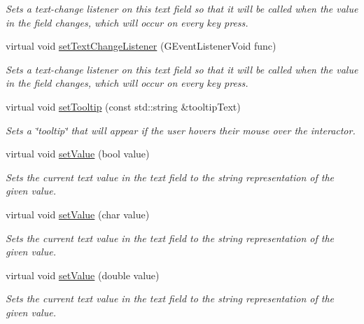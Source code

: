 \begin{DoxyCompactItemize}
\begin{DoxyCompactList}\small\item\em Sets a text-\/change listener on this text field so that it will be called when the value in the field changes, which will occur on every key press. \end{DoxyCompactList}\item 
virtual void \mbox{\hyperlink{classGTextField_ae8df75b0746951146d29220f386fcd33}{set\+Text\+Change\+Listener}} (G\+Event\+Listener\+Void func)
\begin{DoxyCompactList}\small\item\em Sets a text-\/change listener on this text field so that it will be called when the value in the field changes, which will occur on every key press. \end{DoxyCompactList}\item 
virtual void \mbox{\hyperlink{classGInteractor_a039e0e49beaecc275efce02d416acea8}{set\+Tooltip}} (const std\+::string \&tooltip\+Text)
\begin{DoxyCompactList}\small\item\em Sets a \char`\"{}tooltip\char`\"{} that will appear if the user hovers their mouse over the interactor. \end{DoxyCompactList}\item 
virtual void \mbox{\hyperlink{classGTextField_ae803b3348fa7076308d852bbdeea0d74}{set\+Value}} (bool value)
\begin{DoxyCompactList}\small\item\em Sets the current text value in the text field to the string representation of the given value. \end{DoxyCompactList}\item 
virtual void \mbox{\hyperlink{classGTextField_aeefe59b3d414b657838869ce084cb0e2}{set\+Value}} (char value)
\begin{DoxyCompactList}\small\item\em Sets the current text value in the text field to the string representation of the given value. \end{DoxyCompactList}\item 
virtual void \mbox{\hyperlink{classGTextField_a1a31743bc7def7cf7fdad044c84d9268}{set\+Value}} (double value)
\begin{DoxyCompactList}\small\item\em Sets the current text value in the text field to the string representation of the given value. \end{DoxyCompactList}\item 

\end{DoxyCompactItemize}
